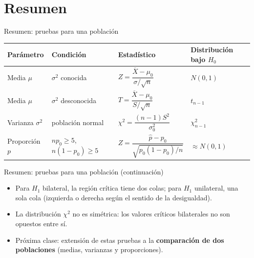 \documentclass[aspectratio=169,11pt]{beamer}
\begin{document}
\section{Resumen}

\begin{frame}{Resumen: pruebas para una población}
\begin{table}[]
\centering
\small
\begin{tabular}{@{}p{2.6cm}p{3.3cm}p{2.6cm}p{3.3cm}@{}}
\toprule
Parámetro & Condición & Estadístico & Distribución bajo $H_0$ \\
\midrule
Media $\mu$ & $\sigma^2$ conocida & $Z=\dfrac{\overline{X}-\mu_0}{\sigma/\sqrt{n}}$ & $N(0,1)$ \\[1.2em]
Media $\mu$ & $\sigma^2$ desconocida & $T=\dfrac{\overline{X}-\mu_0}{S/\sqrt{n}}$ & $t_{n-1}$ \\[1.2em]
Varianza $\sigma^2$ & población normal & $\chi^2=\dfrac{(n-1)S^2}{\sigma_0^2}$ & $\chi^2_{n-1}$ \\[1.2em]
Proporción $p$ & $np_0\ge5$, $n(1-p_0)\ge5$ & $Z=\dfrac{\hat p-p_0}{\sqrt{p_0(1-p_0)/n}}$ & $\approx N(0,1)$ \\
\bottomrule
\end{tabular}
\end{table}

\end{frame}

\begin{frame}{Resumen: pruebas para una población (continuación)}
\begin{itemize}
\item Para $H_1$ bilateral, la región crítica tiene dos colas; para $H_1$ unilateral, una sola cola (izquierda o derecha según el sentido de la desigualdad).
\item La distribución $\chi^2$ no es simétrica: los valores críticos bilaterales no son opuestos entre sí.
\item Próxima clase: extensión de estas pruebas a la \textbf{comparación de dos poblaciones} (medias, varianzas y proporciones).
\end{itemize}
\end{frame}
\end{document}
